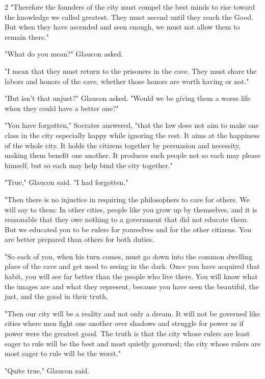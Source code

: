 \documentclass[12pt]{article}
\begin{document}
\begin{multicols}{2}
"Therefore the founders of the city must compel the best minds to rise toward the knowledge we called greatest. They must ascend until they reach the Good. But when they have ascended and seen enough, we must not allow them to remain there."

"What do you mean?" Glaucon asked.

"I mean that they must return to the prisoners in the cave. They must share the labors and honors of the cave, whether those honors are worth having or not."

"But isn't that unjust?" Glaucon asked. "Would we be giving them a worse life when they could have a better one?"

"You have forgotten," Socrates answered, "that the law does not aim to make one class in the city especially happy while ignoring the rest. It aims at the happiness of the whole city. It holds the citizens together by persuasion and necessity, making them benefit one another. It produces such people not so each may please himself, but so each may help bind the city together."

"True," Glaucon said. "I had forgotten."

"Then there is no injustice in requiring the philosophers to care for others. We will say to them: In other cities, people like you grow up by themselves, and it is reasonable that they owe nothing to a government that did not educate them. But we educated you to be rulers for yourselves and for the other citizens. You are better prepared than others for both duties.

"So each of you, when his turn comes, must go down into the common dwelling place of the cave and get used to seeing in the dark. Once you have acquired that habit, you will see far better than the people who live there. You will know what the images are and what they represent, because you have seen the beautiful, the just, and the good in their truth.

"Then our city will be a reality and not only a dream. It will not be governed like cities where men fight one another over shadows and struggle for power as if power were the greatest good. The truth is that the city whose rulers are least eager to rule will be the best and most quietly governed; the city whose rulers are most eager to rule will be the worst."

"Quite true," Glaucon said.


\end{multicols}
\end{document}
